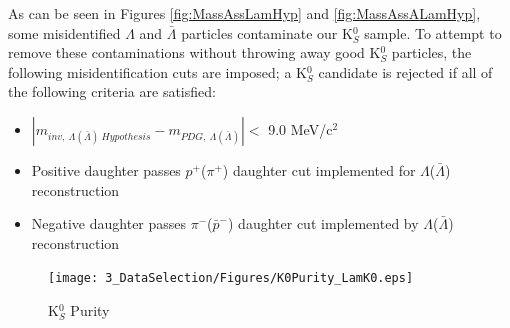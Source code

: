 As can be seen in Figures \ref{fig:MassAssLamHyp} and \ref{fig:MassAssALamHyp}, some misidentified $\Lambda$ and $\bar{\Lambda}$ particles contaminate our K$^{0}_{S}$ sample.  To attempt to remove these contaminations without throwing away good K$^{0}_{S}$ particles, the following misidentification cuts are imposed; a K$^{0}_{S}$ candidate is rejected if all of the following criteria are satisfied:
\begin{itemize}
 \item $|m_{inv, \ \Lambda(\bar{\Lambda}) \ Hypothesis} - m_{PDG,\ \Lambda(\bar{\Lambda})}| < $ 9.0 MeV/c$^{2}$
 \item Positive daughter passes $p^{+}$($\pi^{+}$) daughter cut implemented for $\Lambda$($\bar{\Lambda}$) reconstruction
 \item Negative daughter passes $\pi^{-}$($\bar{p}^{-}$) daughter cut implemented by $\Lambda$($\bar{\Lambda}$) reconstruction
\end{itemize} 


\begin{figure}[h]
  \centering
  \texttt{[image: 3\_DataSelection/Figures/K0Purity\_LamK0.eps]}
  \caption[K$^{0}_{S}$ Purity]{K$^{0}_{S}$ Purity}
  \label{fig:K0Purity}
\end{figure}
